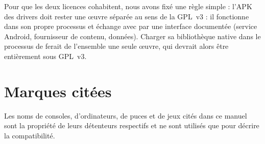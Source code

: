 Pour que les deux licences cohabitent, nous avons fixé une règle simple : l'APK des drivers doit rester une œuvre séparée au sens de la GPL~v3 :
il fonctionne dans son propre processus et échange avec \soft{} par une interface documentée (service Android,
fournisseur de contenu, données). Charger sa bibliothèque native dans le processus de \soft{} ferait de l'ensemble une
seule œuvre, qui devrait alors être entièrement sous GPL~v3.


\section*{Marques citées}
Les noms de consoles, d'ordinateurs, de puces et de jeux cités dans ce manuel sont la propriété de leurs détenteurs
respectifs et ne sont utilisés que pour décrire la compatibilité.
